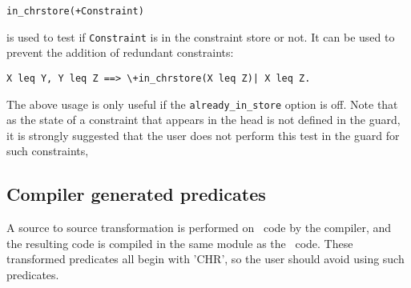 \begin{verbatim}
in_chrstore(+Constraint)
\end{verbatim}

\noindent
is used to test if \verb'Constraint' is in the constraint store or not. It
can be used to prevent the addition of redundant constraints:

\begin{verbatim}
X leq Y, Y leq Z ==> \+in_chrstore(X leq Z)| X leq Z.
\end{verbatim}

The above usage is only useful if the \verb'already_in_store' option is
off. Note that as the state of a constraint that appears in the head is
not defined in the guard, it is strongly suggested that the user does not
perform this test in the guard for such constraints,

\subsection{Compiler generated predicates}

A source to source transformation is performed on \chr\  code by the compiler,
and the resulting code is compiled in the same module as the \chr\  code. These
transformed predicates all begin with 'CHR', so the user should avoid using
such predicates. 







